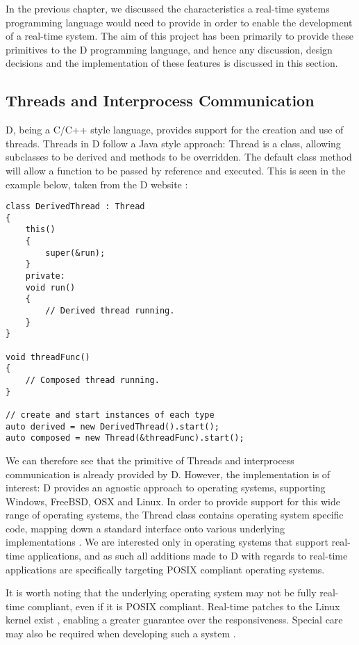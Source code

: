 
In the previous chapter, we discussed the characteristics a real-time 
systems programming language would need to provide in order to enable the 
development of a real-time system. The aim of this project has been primarily to 
provide these primitives to the D programming language, and hence any discussion, 
design decisions and the implementation of these features is discussed in this 
section. 

\subsection{Threads and Interprocess Communication}
D, being a C/C++ style language, provides support for the creation and use of 
threads. Threads in D follow a Java style approach: Thread is a class, 
allowing subclasses to be derived and methods to be overridden. The default 
class method will allow a function to be passed by reference and executed. 
This is seen in the example below, taken from the D website
\cite{core-thread}: 
\begin{lstlisting}
class DerivedThread : Thread
{
    this()
    {
        super(&run);
    }
    private:
    void run()
    {
        // Derived thread running.
    }
}

void threadFunc()
{
    // Composed thread running.
}

// create and start instances of each type
auto derived = new DerivedThread().start();
auto composed = new Thread(&threadFunc).start();
\end{lstlisting}
We can therefore see that the primitive of Threads and interprocess communication 
is already provided by D. However, the implementation is of interest: D 
provides an agnostic approach to operating systems, supporting Windows, FreeBSD, 
OSX and Linux. 
In order to provide support for this wide range of operating systems, the Thread 
class contains operating system specific code, mapping down a standard interface 
onto various underlying implementations 
\cite{github-core-thread}. 
We are interested only in operating systems 
that support real-time applications, and as such all additions made to D with 
regards to real-time applications are specifically targeting POSIX compliant 
operating systems. 
\par\bigskip\noindent
It is worth noting that the underlying operating system may not be fully
real-time compliant, even if it is POSIX compliant. Real-time patches to the 
Linux kernel exist 
\cite{rt-wiki}, enabling a greater 
guarantee over the responsiveness. Special care may also be required when 
developing such a system 
\cite {rt-wiki-how-to}. 

